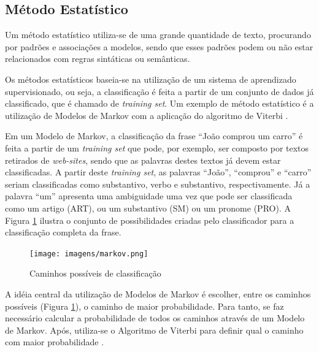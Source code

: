 \subsection{Método Estatístico}
Um método estatístico utiliza-se de uma grande
quantidade de texto, procurando por padrões e
associações a modelos, sendo que esses padrões podem ou não estar relacionados
com regras sintáticas ou semânticas.

Os métodos estatísticos baseia-se na utilização de um sistema de aprendizado
supervisionado, ou seja, a classificação é feita a partir de um conjunto de dados já
classificado, que é chamado de \textit{training set}. Um exemplo de método
estatístico é a utilização de Modelos de Markov com a aplicação do algoritmo de
Viterbi \cite{manningschutze1999}.

Em um Modelo de Markov, a classificação da frase ``João comprou um
carro'' é feita a partir de um \textit{training set} que pode, por exemplo, ser
composto por textos retirados de \textit{web-sites}, sendo que as palavras
destes textos já devem estar classificadas. A partir deste \textit{training
set}, as palavras ``João'', ``comprou'' e ``carro'' seriam classificadas como
substantivo, verbo e substantivo, respectivamente. Já a palavra ``um'' apresenta uma ambiguidade uma vez que pode
ser classificada como um artigo (ART), ou um substantivo (SM) ou um pronome
(PRO).
A Figura \ref{fig:markov} ilustra o conjunto de possibilidades criadas pelo
classificador para a classificação completa da frase.

\begin{figure}[htbp]
\centering
\texttt{[image: imagens/markov.png]}
\caption{Caminhos possíveis de classificação}
\label{fig:markov}
\end{figure}

A idéia central da utilização de Modelos de Markov é
escolher, entre os caminhos possíveis (Figura \ref{fig:markov}), o caminho
de maior probabilidade. Para tanto, se faz necessário calcular a probabilidade de todos
os caminhos através de um Modelo de Markov. Após, utiliza-se o
Algoritmo de Viterbi para definir qual o caminho com maior probabilidade
\cite{manningschutze1999}.

